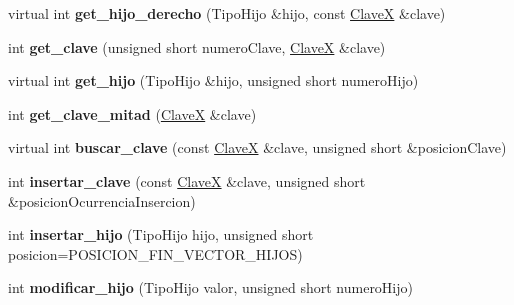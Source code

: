 \begin{DoxyCompactItemize}
\item 
\hypertarget{class_nodo_interno_a000a62081d77fda83cdc4cfa8204cd28}{virtual int {\bfseries get\-\_\-hijo\-\_\-derecho} (\-Tipo\-Hijo \&hijo, const \hyperlink{class_clave_x}{\-Clave\-X} \&clave)}\label{class_nodo_interno_a000a62081d77fda83cdc4cfa8204cd28}

\item 
\hypertarget{class_nodo_interno_a1ad2999cf1fb7ae040cdaa77bacefda3}{int {\bfseries get\-\_\-clave} (unsigned short numero\-Clave, \hyperlink{class_clave_x}{\-Clave\-X} \&clave)}\label{class_nodo_interno_a1ad2999cf1fb7ae040cdaa77bacefda3}

\item 
\hypertarget{class_nodo_interno_a7d8d883f13af1be7dde84cf6ee9e1dc0}{virtual int {\bfseries get\-\_\-hijo} (\-Tipo\-Hijo \&hijo, unsigned short numero\-Hijo)}\label{class_nodo_interno_a7d8d883f13af1be7dde84cf6ee9e1dc0}

\item 
\hypertarget{class_nodo_interno_a7634dccc0c5696daec3ce21a8bab196f}{int {\bfseries get\-\_\-clave\-\_\-mitad} (\hyperlink{class_clave_x}{\-Clave\-X} \&clave)}\label{class_nodo_interno_a7634dccc0c5696daec3ce21a8bab196f}

\item 
\hypertarget{class_nodo_interno_aa12b90a0e140aeeb5ce818e9f054aadf}{virtual int {\bfseries buscar\-\_\-clave} (const \hyperlink{class_clave_x}{\-Clave\-X} \&clave, unsigned short \&posicion\-Clave)}\label{class_nodo_interno_aa12b90a0e140aeeb5ce818e9f054aadf}

\item 
\hypertarget{class_nodo_interno_aa565e1543e52791144e1548dec983eb8}{int {\bfseries insertar\-\_\-clave} (const \hyperlink{class_clave_x}{\-Clave\-X} \&clave, unsigned short \&posicion\-Ocurrencia\-Insercion)}\label{class_nodo_interno_aa565e1543e52791144e1548dec983eb8}

\item 
\hypertarget{class_nodo_interno_a356bb840adf8e625e1660cea3ce81689}{int {\bfseries insertar\-\_\-hijo} (\-Tipo\-Hijo hijo, unsigned short posicion=\-P\-O\-S\-I\-C\-I\-O\-N\-\_\-\-F\-I\-N\-\_\-\-V\-E\-C\-T\-O\-R\-\_\-\-H\-I\-J\-O\-S)}\label{class_nodo_interno_a356bb840adf8e625e1660cea3ce81689}

\item 
\hypertarget{class_nodo_interno_a73d5f9c5d722a8d7cf5f900b663da5f3}{int {\bfseries modificar\-\_\-hijo} (\-Tipo\-Hijo valor, unsigned short numero\-Hijo)}\label{class_nodo_interno_a73d5f9c5d722a8d7cf5f900b663da5f3}


\end{DoxyCompactItemize}
